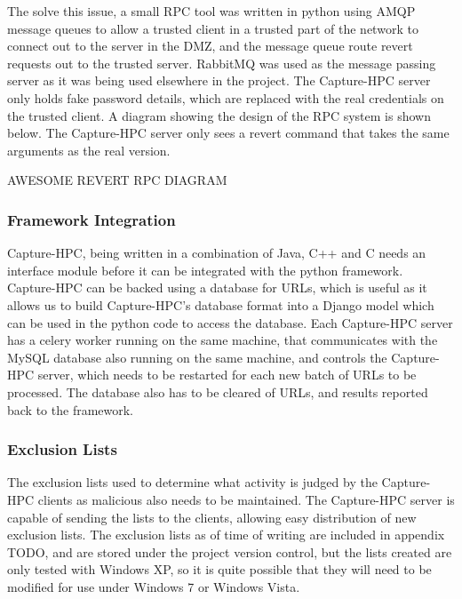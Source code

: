 The solve this issue, a small RPC tool was written in python using AMQP message
 queues to
allow a trusted client in a trusted part of the network to connect out to the
server in the DMZ, and the message queue route revert requests out to the
trusted server. RabbitMQ was used as the message passing server as it was being
used elsewhere in the project. The Capture-HPC server only holds fake password details, which
are replaced with the real credentials on the trusted client. A diagram showing
the design of the RPC system is shown below. The Capture-HPC server only sees a
revert command that takes the same arguments as the real version. 

AWESOME REVERT RPC DIAGRAM

\subsubsection{Framework Integration}

Capture-HPC, being written in a combination of Java, C++ and C needs an
interface module before it can be integrated with the python framework.
Capture-HPC can be backed using a database for URLs, which is useful as it
allows us to build Capture-HPC's database format into a Django model which can
be used in the python code to access the database. Each Capture-HPC server has a
celery worker running on the same machine, that communicates with the MySQL
database also running on the same machine, and controls the Capture-HPC
server, which needs to be restarted for each new batch of URLs to be processed.
The database also has to be cleared of URLs, and results reported back to the
framework.

\subsubsection{Exclusion Lists}

The exclusion lists used to determine what activity is judged by the Capture-HPC
clients as malicious also needs to be maintained. The Capture-HPC server is
capable of sending the lists to the clients, allowing easy distribution of new
exclusion lists. The exclusion lists as of time of writing are included in
appendix TODO, and are stored under the project version control, but the lists
created are only tested with Windows XP, so it is quite possible that they will
need to be modified for use under Windows 7 or Windows Vista.


